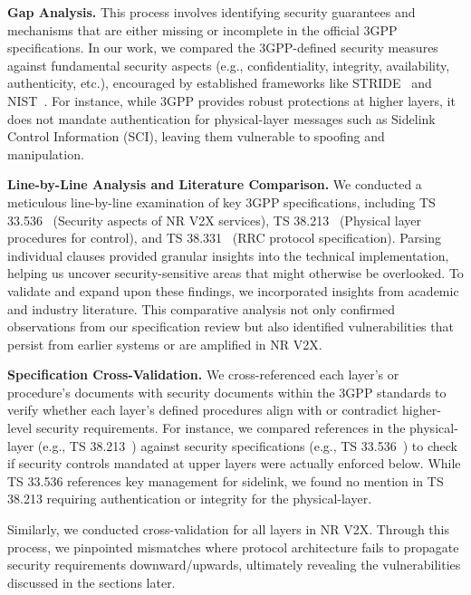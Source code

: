 \noindent\textbf{Gap Analysis.} This process involves identifying security guarantees and mechanisms that are either missing or incomplete in the official 3GPP specifications. In our work, we compared the 3GPP-defined security measures against fundamental security aspects (e.g., confidentiality, integrity, availability, authenticity, etc.), encouraged by established frameworks like STRIDE~\cite{hernan2006stride} and NIST~\cite{nist2018framework}. For instance, while 3GPP provides robust protections at higher layers, it does not mandate authentication for physical-layer messages such as Sidelink Control Information (SCI), leaving them vulnerable to spoofing and manipulation.

\noindent\textbf{Line-by-Line Analysis and Literature Comparison.} We conducted a meticulous line-by-line examination of key 3GPP specifications, including TS 33.536~\cite{3gpp.33.536} (Security aspects of NR V2X services), TS 38.213~\cite{3gpp.38.213} (Physical layer procedures for control), and TS 38.331~\cite{3gpp.38.331} (RRC protocol specification). %
Parsing individual clauses provided granular insights into the technical implementation, helping us uncover security-sensitive areas that might otherwise be overlooked. To validate and expand upon these findings, we incorporated insights from academic and industry literature. This comparative analysis not only confirmed observations from our specification review but also identified vulnerabilities that persist from earlier systems or are amplified in NR V2X.

\noindent\textbf{Specification Cross-Validation.} We cross-referenced each layer's or procedure's documents with security documents within the 3GPP standards to verify whether each layer’s defined procedures align with or contradict higher-level security requirements. For instance, we compared references in the physical-layer (e.g., TS 38.213~\cite{3gpp.38.213}) against security specifications (e.g., TS 33.536~\cite{3gpp.33.536}) to check if security controls mandated at upper layers were actually enforced below. While TS 33.536 references key management for sidelink, we found no mention in TS 38.213 requiring authentication or integrity for the physical-layer. 

Similarly, we conducted cross-validation for all layers in NR V2X. Through this process, we pinpointed mismatches where protocol architecture fails to propagate security requirements downward/upwards, ultimately revealing the vulnerabilities discussed in the sections later.

